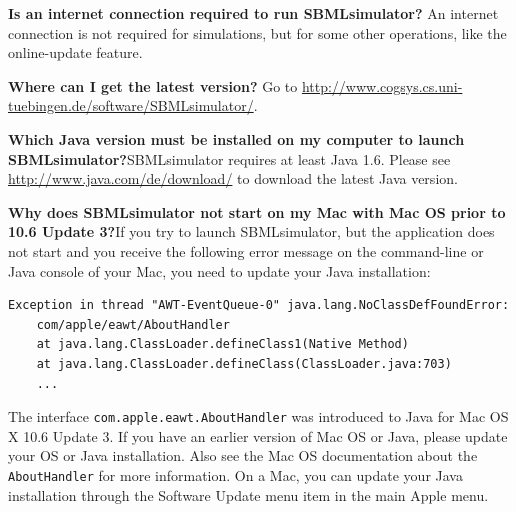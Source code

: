 \noindent \textbf{Is an internet connection required to run SBMLsimulator?}\newline
An internet connection is not required for simulations, but for some other operations, like the online-update feature.\newline

\noindent \textbf{Where can I get the latest version?}\newline
Go to \url{http://www.cogsys.cs.uni-tuebingen.de/software/SBMLsimulator/}.\newline

\noindent \textbf{Which Java version must be installed on my computer to launch
SBMLsimulator?}\newline SBMLsimulator requires at least Java 1.6. Please see
\url{http://www.java.com/de/download/} to download the latest Java version.

\noindent \textbf{Why does SBMLsimulator not start on my Mac with Mac OS prior to
10.6 Update 3?}\newline If you try to launch SBMLsimulator, but the application does
not start and you receive the following error message on the command-line or
Java console of your Mac, you need to update your Java installation:
\begin{verbatim}
Exception in thread "AWT-EventQueue-0" java.lang.NoClassDefFoundError:
    com/apple/eawt/AboutHandler
    at java.lang.ClassLoader.defineClass1(Native Method)
    at java.lang.ClassLoader.defineClass(ClassLoader.java:703)
    ...
\end{verbatim}
The interface \texttt{com.apple.eawt.AboutHandler} was introduced to Java for
Mac OS X 10.6 Update 3. If you have an earlier version of Mac OS or Java,
please update your OS or Java installation. Also see the Mac OS documentation
about the \texttt{AboutHandler} for more information. On a Mac, you can update
your Java installation through the Software Update menu item in the main Apple
menu.

